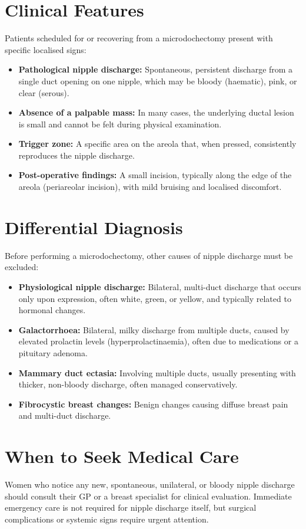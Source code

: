 \section*{Clinical Features}
Patients scheduled for or recovering from a microdochectomy present with specific localised signs:

\begin{itemize}
    \item \textbf{Pathological nipple discharge:} Spontaneous, persistent discharge from a single duct opening on one nipple, which may be bloody (haematic), pink, or clear (serous).
    \item \textbf{Absence of a palpable mass:} In many cases, the underlying ductal lesion is small and cannot be felt during physical examination.
    \item \textbf{Trigger zone:} A specific area on the areola that, when pressed, consistently reproduces the nipple discharge.
    \item \textbf{Post-operative findings:} A small incision, typically along the edge of the areola (periareolar incision), with mild bruising and localised discomfort.
\end{itemize}

\section*{Differential Diagnosis}
Before performing a microdochectomy, other causes of nipple discharge must be excluded:

\begin{itemize}
    \item \textbf{Physiological nipple discharge:} Bilateral, multi-duct discharge that occurs only upon expression, often white, green, or yellow, and typically related to hormonal changes.
    \item \textbf{Galactorrhoea:} Bilateral, milky discharge from multiple ducts, caused by elevated prolactin levels (hyperprolactinaemia), often due to medications or a pituitary adenoma.
    \item \textbf{Mammary duct ectasia:} Involving multiple ducts, usually presenting with thicker, non-bloody discharge, often managed conservatively.
    \item \textbf{Fibrocystic breast changes:} Benign changes causing diffuse breast pain and multi-duct discharge.
\end{itemize}

\section*{When to Seek Medical Care}
Women who notice any new, spontaneous, unilateral, or bloody nipple discharge should consult their GP or a breast specialist for clinical evaluation. Immediate emergency care is not required for nipple discharge itself, but surgical complications or systemic signs require urgent attention.

